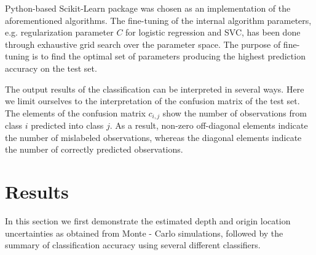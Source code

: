 Python-based Scikit-Learn package was chosen as an implementation of the aforementioned algorithms. The fine-tuning of the internal algorithm parameters, e.g. regularization parameter $C$ for logistic regression and SVC, has been done through exhaustive grid search over the parameter space. The purpose of fine-tuning is to find the optimal set of parameters producing the highest prediction accuracy on the test set.

The output results of the classification can be interpreted in several ways. Here we limit ourselves to the interpretation of the confusion matrix of the test set. The elements of the confusion matrix $c_{i,j}$ show the number of observations from class $i$ predicted into class $j$. As a result, non-zero off-diagonal elements indicate the number of mislabeled observations, whereas the diagonal elements indicate the number of correctly predicted observations.
\section{Results}
In this section we first demonstrate the estimated depth and origin location uncertainties as obtained from Monte - Carlo simulations, followed by the summary of classification accuracy using several different classifiers.
